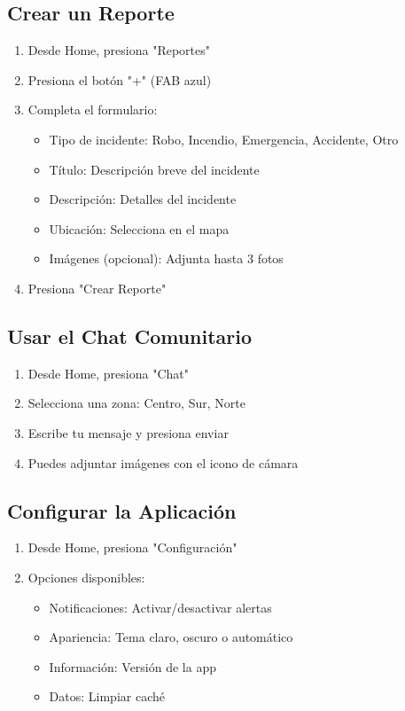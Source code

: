 \documentclass[12pt,a4paper]{article}
\begin{document}
\subsection{Crear un Reporte}

\begin{enumerate}
    \item Desde Home, presiona "Reportes"
    \item Presiona el botón "+" (FAB azul)
    \item Completa el formulario:
    \begin{itemize}
        \item Tipo de incidente: Robo, Incendio, Emergencia, Accidente, Otro
        \item Título: Descripción breve del incidente
        \item Descripción: Detalles del incidente
        \item Ubicación: Selecciona en el mapa
        \item Imágenes (opcional): Adjunta hasta 3 fotos
    \end{itemize}
    \item Presiona "Crear Reporte"
\end{enumerate}

\subsection{Usar el Chat Comunitario}

\begin{enumerate}
    \item Desde Home, presiona "Chat"
    \item Selecciona una zona: Centro, Sur, Norte
    \item Escribe tu mensaje y presiona enviar
    \item Puedes adjuntar imágenes con el icono de cámara
\end{enumerate}

\subsection{Configurar la Aplicación}

\begin{enumerate}
    \item Desde Home, presiona "Configuración"
    \item Opciones disponibles:
    \begin{itemize}
        \item Notificaciones: Activar/desactivar alertas
        \item Apariencia: Tema claro, oscuro o automático
        \item Información: Versión de la app
        \item Datos: Limpiar caché
    \end{itemize}
\end{enumerate}
\end{document}
